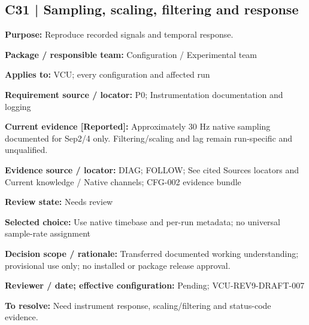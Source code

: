 \documentclass[11pt]{article}
\begin{document}
\par\noindent\begin{minipage}{\textwidth}\small\setlength{\parskip}{2pt}
\subsection*{C31 | Sampling, scaling, filtering and response}
\textbf{Purpose:} Reproduce recorded signals and temporal response.\par
\textbf{Package / responsible team:} Configuration / Experimental team\par
\textbf{Applies to:} VCU; every configuration and affected run\par
\textbf{Requirement source / locator:} P0; Instrumentation documentation and logging\par
\textbf{Current evidence [Reported]:} Approximately 30 Hz native sampling documented for Sep2/4 only. Filtering/scaling and lag remain run-specific and unqualified.\par
\textbf{Evidence source / locator:} DIAG; FOLLOW; See cited Sources locators and Current knowledge / Native channels; CFG-002 evidence bundle\par
\textbf{Review state:} Needs review\par
\textbf{Selected choice:} Use native timebase and per-run metadata; no universal sample-rate assignment\par
\textbf{Decision scope / rationale:} Transferred documented working understanding; provisional use only; no installed or package release approval.\par
\textbf{Reviewer / date; effective configuration:} Pending; VCU-REV9-DRAFT-007\par
\textbf{To resolve:} Need instrument response, scaling/filtering and status-code evidence.\par
\end{minipage}\par\vspace{5pt}
\end{document}
